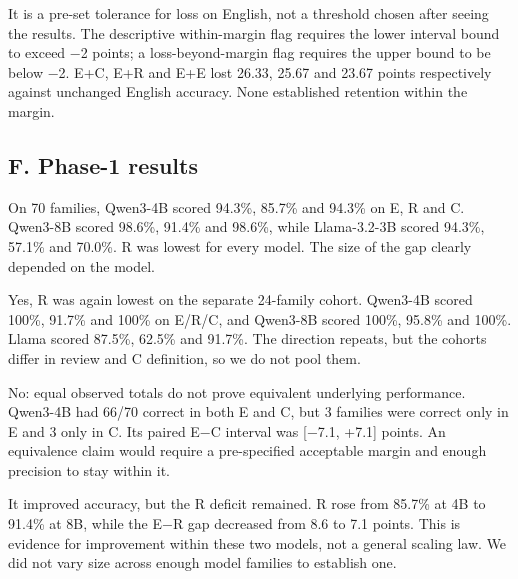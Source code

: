 It is a pre-set tolerance for loss on English, not a threshold chosen after seeing the results. The descriptive within-margin flag requires the lower interval bound to exceed −2 points; a loss-beyond-margin flag requires the upper bound to be below −2. E+C, E+R and E+E lost 26.33, 25.67 and 23.67 points respectively against unchanged English accuracy. None established retention within the margin.

\subsection*{F. Phase-1 results}


\medskip{}\par\nopagebreak

On 70 families, Qwen3-4B scored 94.3\%, 85.7\% and 94.3\% on E, R and C. Qwen3-8B scored 98.6\%, 91.4\% and 98.6\%, while Llama-3.2-3B scored 94.3\%, 57.1\% and 70.0\%. R was lowest for every model. The size of the gap clearly depended on the model.

\medskip{}\par\nopagebreak

Yes, R was again lowest on the separate 24-family cohort. Qwen3-4B scored 100\%, 91.7\% and 100\% on E/R/C, and Qwen3-8B scored 100\%, 95.8\% and 100\%. Llama scored 87.5\%, 62.5\% and 91.7\%. The direction repeats, but the cohorts differ in review and C definition, so we do not pool them.

\medskip{}\par\nopagebreak

No: equal observed totals do not prove equivalent underlying performance. Qwen3-4B had 66/70 correct in both E and C, but 3 families were correct only in E and 3 only in C. Its paired E−C interval was [−7.1, +7.1] points. An equivalence claim would require a pre-specified acceptable margin and enough precision to stay within it.

\medskip{}\par\nopagebreak

It improved accuracy, but the R deficit remained. R rose from 85.7\% at 4B to 91.4\% at 8B, while the E−R gap decreased from 8.6 to 7.1 points. This is evidence for improvement within these two models, not a general scaling law. We did not vary size across enough model families to establish one.


